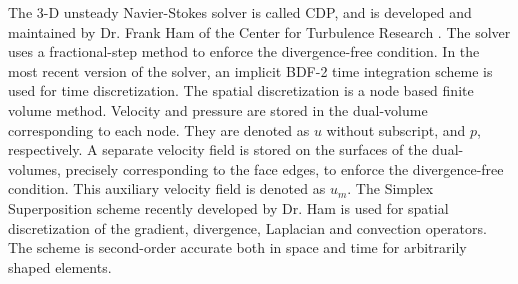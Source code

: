 The 3-D unsteady Navier-Stokes solver is called CDP, and is
developed and maintained by Dr. Frank Ham of the Center for Turbulence
Research \cite[]{cdp1}.  The solver uses a fractional-step method
to enforce the divergence-free condition.
In the most recent version of the solver, an implicit BDF-2
time integration scheme \cite[]{bdf2} is used for time discretization.
The spatial discretization is a node based finite volume method.
Velocity and pressure are stored in the dual-volume corresponding to each node.
They are denoted as $u$ without subscript, and $p$, respectively.
A separate velocity field is stored on the surfaces of the dual-volumes,
precisely corresponding to the face edges, to enforce the divergence-free
condition.  This auxiliary velocity field
is denoted as $u_m$.  The Simplex Superposition scheme \cite[]{ss}
recently developed by Dr. Ham is used for spatial
discretization of the gradient, divergence, Laplacian and convection operators.
The scheme is second-order accurate both in space and time for arbitrarily
shaped elements.

